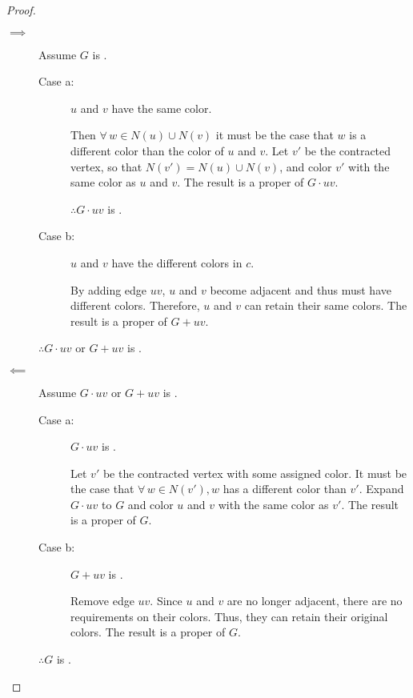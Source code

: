 \begin{proof}
  \begin{description}
  \item[]
  \item[\(\implies\)] Assume \(G\) is .

    \begin{description}
    \item [Case a:] \(u\) and \(v\) have the same color.

      Then \(\forall\,w\in N(u)\cup N(v)\) it must be the case that \(w\) is a different color than the color of \(u\) and
      \(v\).  Let \(v'\) be the contracted vertex, so that \(N(v')=N(u)\cup N(v)\), and color \(v'\) with the same color as
      \(u\) and \(v\).  The result is a proper  of \(G\cdot uv\).

      \(\therefore G\cdot uv\) is .
      
    \item [Case b:] \(u\) and \(v\) have the different colors in \(c\).

      By adding edge \(uv\), \(u\) and \(v\) become adjacent and thus must have different colors.  Therefore, \(u\) and \(v\)
      can retain their same colors.  The result is a proper  of \(G+uv\).
    \end{description}

    \(\therefore G\cdot uv\) or \(G+uv\) is .
    
  \item[\(\impliedby\)] Assume \(G\cdot uv\) or \(G+uv\) is .

    \begin{description}
    \item [Case a:] \(G\cdot uv\) is .

      Let \(v'\) be the contracted vertex with some assigned color.  It must be the case that \(\forall\,w\in N(v'), w\) has a
      different color than \(v'\).  Expand \(G\cdot uv\) to \(G\) and color \(u\) and \(v\) with the same color as \(v'\).
      The result is a proper  of \(G\).
      
    \item [Case b:] \(G+uv\) is .

      Remove edge \(uv\).  Since \(u\) and \(v\) are no longer adjacent, there are no requirements on their colors.  Thus,
      they can retain their original colors.  The result is a proper  of \(G\).
    \end{description}

    \(\therefore G\) is .
  \end{description}
\end{proof}
